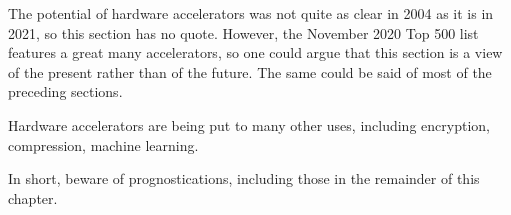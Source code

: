 The potential of hardware accelerators was not quite as clear in 2004
as it is in 2021, so this section has no quote.
However, the November 2020 Top 500 list~\cite{Top500} features a great
many accelerators, so one could argue that this section is a view of
the present rather than of the future.
The same could be said of most of the preceding sections.

Hardware accelerators are being put to many other uses, including
encryption, compression, machine learning.

In short, beware of prognostications, including those in the remainder
of this chapter.
